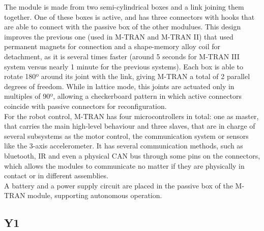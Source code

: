 The module is made from two semi-cylindrical boxes and a link joining them together. One of these boxes is active, and has three connectors with hooks that are able to connect with the passive box of the other modulues. This design improves the previous one (used in M-TRAN and M-TRAN II) that used permanent magnets for connection and a shape-memory alloy coil for detachment, as it is several times faster (around 5 seconds for M-TRAN III system versus nearly 1 minute for the previous systems). Each box is able to rotate 180º around its joint with the link, giving M-TRAN a total of 2 parallel degrees of freedom. While in lattice mode, this joints are actuated only in multiples of 90º, allowing a checkerboard pattern in which active connectors coincide with passive connectors for reconfiguration.
\\

For the robot control, M-TRAN has four microcontrollers in total: one as master, that carries the main high-level behaviour and three slaves, that are in charge of several subsystems as the motor control, the communication system or sensors like the 3-axis accelerometer. It has several communication methods, such as bluetooth, IR and even a physical CAN bus through some pins on the connectors, which allows the modules to communicate no matter if they are physically in contact or in different assemblies.
\\

A battery and a power supply circuit are placed in the passive box of the M-TRAN module, supporting autonomous operation.



\subsection{Y1}
\label{state_modules_y1}


